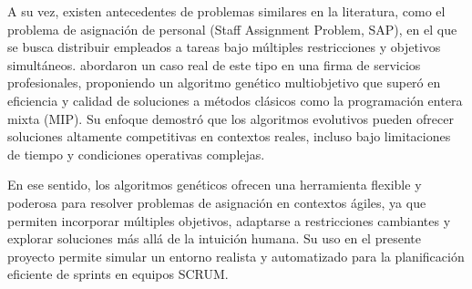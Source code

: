 A su vez, existen antecedentes de problemas similares en la literatura, como el problema de asignación de personal (Staff Assignment Problem, SAP), en el que se busca distribuir empleados a tareas bajo múltiples restricciones y objetivos simultáneos. \textcite{peters2019staff} abordaron un caso real de este tipo en una firma de servicios profesionales, proponiendo un algoritmo genético multiobjetivo que superó en eficiencia y calidad de soluciones a métodos clásicos como la programación entera mixta (MIP). Su enfoque demostró que los algoritmos evolutivos pueden ofrecer soluciones altamente competitivas en contextos reales, incluso bajo limitaciones de tiempo y condiciones operativas complejas.


En ese sentido, los algoritmos genéticos ofrecen una herramienta flexible y poderosa para resolver problemas de asignación en contextos ágiles, ya que permiten incorporar múltiples objetivos, adaptarse a restricciones cambiantes y explorar soluciones más allá de la intuición humana. Su uso en el presente proyecto permite simular un entorno realista y automatizado para la planificación eficiente de sprints en equipos SCRUM.








